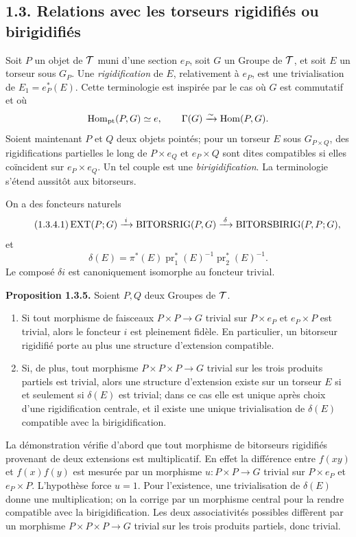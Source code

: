 \documentclass[11pt]{article}
\providecommand{\pr}{\operatorname{pr}}
\begin{document}
\subsection*{1.3. Relations avec les torseurs rigidifiés ou birigidifiés}

Soit \(P\) un objet de \(\mathcal T\) muni d'une section \(e_P\), soit \(G\) un Groupe de \(\mathcal T\), et soit \(E\) un torseur sous \(G_P\).  Une \emph{rigidification} de \(E\), relativement à \(e_P\), est une trivialisation de \(E_1=e_P^*(E)\).  Cette terminologie est inspirée par le cas où \(G\) est commutatif et où
\[
  \operatorname{Hom}_{\mathrm{pt}}(P,G)\simeq e,\qquad
  \Gamma(G)\xrightarrow{\sim}\operatorname{Hom}(P,G).
\]
Soient maintenant \(P\) et \(Q\) deux objets pointés; pour un torseur \(E\) sous \(G_{P\times Q}\), des rigidifications partielles le long de \(P\times e_Q\) et \(e_P\times Q\) sont dites compatibles si elles coïncident sur \(e_P\times e_Q\).  Un tel couple est une \emph{birigidification}.  La terminologie s'étend aussitôt aux bitorseurs.

On a des foncteurs naturels
\begin{equation}\tag{1.3.4.1}
  \operatorname{EXT}(P;G)\xrightarrow{\;i\;}\operatorname{BITORSRIG}(P,G)
  \xrightarrow{\;\delta\;}\operatorname{BITORSBIRIG}(P,P;G),
\end{equation}
et
\begin{equation}\tag{1.3.4.2}
  \delta(E)=\pi^*(E)\pr_1^*(E)^{-1}\pr_2^*(E)^{-1}.
\end{equation}
Le composé \(\delta i\) est canoniquement isomorphe au foncteur trivial.

\textbf{Proposition 1.3.5.}  Soient \(P,Q\) deux Groupes de \(\mathcal T\).
\begin{enumerate}[label=\alph*)]
\item Si tout morphisme de faisceaux \(P\times P\to G\) trivial sur \(P\times e_P\) et \(e_P\times P\) est trivial, alors le foncteur \(i\) est pleinement fidèle.  En particulier, un bitorseur rigidifié porte au plus une structure d'extension compatible.
\item Si, de plus, tout morphisme \(P\times P\times P\to G\) trivial sur les trois produits partiels est trivial, alors une structure d'extension existe sur un torseur \(E\) si et seulement si \(\delta(E)\) est trivial; dans ce cas elle est unique après choix d'une rigidification centrale, et il existe une unique trivialisation de \(\delta(E)\) compatible avec la birigidification.
\end{enumerate}

La démonstration vérifie d'abord que tout morphisme de bitorseurs rigidifiés provenant de deux extensions est multiplicatif.  En effet la différence entre \(f(xy)\) et \(f(x)f(y)\) est mesurée par un morphisme \(u:P\times P\to G\) trivial sur \(P\times e_P\) et \(e_P\times P\).  L'hypothèse force \(u=1\).  Pour l'existence, une trivialisation de \(\delta(E)\) donne une multiplication; on la corrige par un morphisme central pour la rendre compatible avec la birigidification.  Les deux associativités possibles diffèrent par un morphisme \(P\times P\times P\to G\) trivial sur les trois produits partiels, donc trivial.
\end{document}
